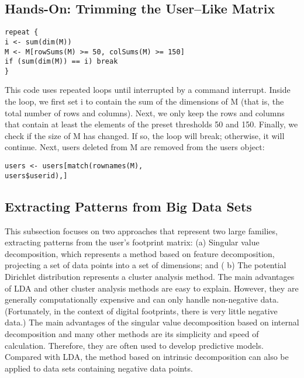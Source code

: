\subsection{Hands-On: Trimming the User–Like Matrix}

\begin{verbatim}
repeat {
i <- sum(dim(M))
M <- M[rowSums(M) >= 50, colSums(M) >= 150]
if (sum(dim(M)) == i) break
}
\end{verbatim}

This code uses repeated loops until interrupted by a command 
interrupt. Inside the loop, we first set i to contain the sum of 
the dimensions of M (that is, the total number of rows and 
columns). Next, we only keep the rows and columns that contain at 
least the elements of the preset thresholds 50 and 150. Finally, 
we check if the size of M has changed. If so, the loop will break;
 otherwise, it will continue.
Next, users deleted from M are removed from the users object:

\begin{verbatim}
users <- users[match(rownames(M),
users$userid),]
\end{verbatim}

\subsection{Extracting Patterns from Big Data Sets}

This subsection focuses on two approaches that represent two large 
families, extracting patterns from the user's footprint matrix: 
(a) Singular value decomposition, which represents a method based 
on feature decomposition, projecting a set of data points into a 
set of dimensions; and ( b) The potential Dirichlet distribution 
represents a cluster analysis method. The main advantages of LDA 
and other cluster analysis methods are easy to explain. However, 
they are generally computationally expensive and can only handle 
non-negative data. (Fortunately, in the context of digital 
footprints, there is very little negative data.) The main 
advantages of the singular value decomposition based on internal 
decomposition and many other methods are its simplicity and speed 
of calculation. Therefore, they are often used to develop 
predictive models. Compared with LDA, the method based on 
intrinsic decomposition can also be applied to data sets containing
 negative data points.

